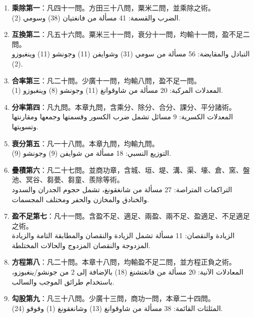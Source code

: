 \documentclass[11pt,a4paper]{article}
\newcommand{\ar}[1]{\arabicfont\beginR #1\endR}
\begin{document}
\begin{enumerate}[label=\textbf{\arabic*.},leftmargin=2em]
\item \textbf{乘除第一}：凡四十一問。方田三十八問，粟米二問，並乘除之術。\\
  \ar{الضرب والقسمة: 41 مسألة من فانغتيان (38) وسومي (2).}

\item \textbf{互換第二}：凡五十六問。粟米三十一問，衰分十一問，均輸十一問，盈不足二問。\\
  \ar{التبادل والمقايضة: 56 مسألة من سومي (31) وشوايفن (11) وجونشو (11) وينغبوزو (2).}

\item \textbf{合率第三}：凡二十問。少廣十一問，均輸八問，盈不足一問。\\
  \ar{المعدلات المركبة: 20 مسألة من شاوقوانغ (11) وجونشو (8) وينغبوزو (1).}

\item \textbf{分率第四}：凡九問。本章九問，含乘分、除分、合分、課分、平分諸術。\\
  \ar{المعدلات الكسرية: 9 مسائل تشمل ضرب الكسور وقسمتها وجمعها ومقارنتها وتسويتها.}

\item \textbf{衰分第五}：凡一十八問。本章九問，均輸九問。\\
  \ar{التوزيع النسبي: 18 مسألة من شوايفن (9) وجونشو (9).}

\item \textbf{疊積第六}：凡二十七問。並商功章，含城、垣、堤、溝、渠、壕、倉、窯、盤池、冥谷、芻甍、芻童、羨除等術。\\
  \ar{التراكمات المتراصة: 27 مسألة من شانغقونغ، تشمل حجوم الجدران والسدود والخنادق والمخازن والحفر ومختلف المجسمات.}

\item \textbf{盈不足第七}：凡十一問。含盈不足、適足、兩盈、兩不足、盈適足、不足適足之術。\\
  \ar{الزيادة والنقصان: 11 مسألة تشمل الزيادة والنقصان والمطابقة التامة والزيادة المزدوجة والنقصان المزدوج والحالات المختلطة.}

\item \textbf{方程第八}：凡二十問。本章十八問，均輸盈不足二問，並方程正負之術。\\
  \ar{المعادلات الآنية: 20 مسألة من فانغتشنغ (18) بالإضافة إلى 2 من جونشو/ينغبوزو، باستخدام طرائق الموجب والسالب.}

\item \textbf{勾股第九}：凡三十八問。少廣十三問，商功一問，本章二十四問。\\
  \ar{المثلثات القائمة: 38 مسألة من شاوقوانغ (13) وشانغقونغ (1) وقوقو (24).}
\end{enumerate}
\end{document}
